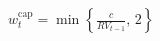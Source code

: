 \documentclass[11pt,border=2pt]{standalone}
\begin{document}
{\color{mathblue}$\displaystyle w_t^{\mathrm{cap}}=\min\!\left\{\frac{c}{RV_{t-1}},\,2\right\}$}
\end{document}
